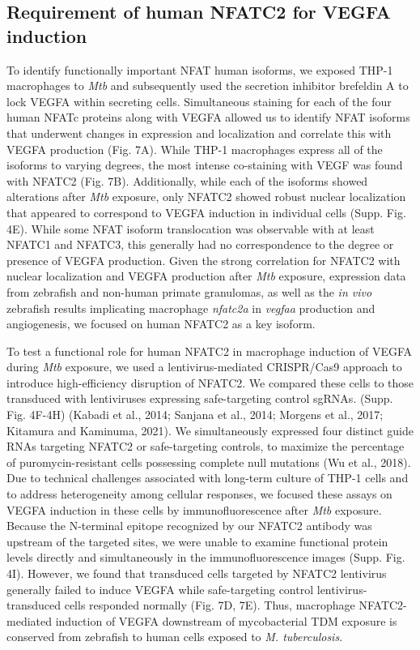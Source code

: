 \subsection{Requirement of human NFATC2 for VEGFA induction}

To identify functionally important NFAT human isoforms, we exposed THP-1 macrophages to \textgamma\textit{Mtb} and subsequently used the secretion inhibitor brefeldin A to lock VEGFA within secreting cells. Simultaneous staining for each of the four human NFATc proteins along with VEGFA allowed us to identify NFAT isoforms that underwent changes in expression and localization and correlate this with VEGFA production (Fig. 7A). While THP-1 macrophages express all of the isoforms to varying degrees, the most intense co-staining with VEGF was found with NFATC2 (Fig. 7B). Additionally, while each of the isoforms showed alterations after \textgamma\textit{Mtb} exposure, only NFATC2 showed robust nuclear localization that appeared to correspond to VEGFA induction in individual cells (Supp. Fig. 4E). While some NFAT isoform translocation was observable with at least NFATC1 and NFATC3, this generally had no correspondence to the degree or presence of VEGFA production. Given the strong correlation for NFATC2 with nuclear localization and VEGFA production after \textgamma\textit{Mtb} exposure, expression data from zebrafish and non-human primate granulomas, as well as the \textit{in vivo} zebrafish results implicating macrophage \textit{nfatc2a} in \textit{vegfaa} production and angiogenesis, we focused on human NFATC2 as a key isoform.

To test a functional role for human NFATC2 in macrophage induction of VEGFA during \textgamma\textit{Mtb} exposure, we used a lentivirus-mediated CRISPR/Cas9 approach to introduce high-efficiency disruption of NFATC2. We compared these cells to those transduced with lentiviruses expressing safe-targeting control sgRNAs. (Supp. Fig. 4F-4H) (Kabadi et al., 2014; Sanjana et al., 2014; Morgens et al., 2017; Kitamura and Kaminuma, 2021). We simultaneously expressed four distinct guide RNAs targeting NFATC2 or safe-targeting controls, to maximize the percentage of puromycin-resistant cells possessing complete null mutations (Wu et al., 2018). Due to technical challenges associated with long-term culture of THP-1 cells and to address heterogeneity among cellular responses, we focused these assays on VEGFA induction in these cells by immunofluorescence after \textgamma\textit{Mtb} exposure. Because the N-terminal epitope recognized by our NFATC2 antibody was upstream of the targeted sites, we were unable to examine functional protein levels directly and simultaneously in the immunofluorescence images (Supp. Fig. 4I). However, we found that transduced cells targeted by NFATC2 lentivirus generally failed to induce VEGFA while safe-targeting control lentivirus-transduced cells responded normally (Fig. 7D, 7E). Thus, macrophage NFATC2-mediated induction of VEGFA downstream of mycobacterial TDM exposure is conserved from zebrafish to human cells exposed to \textit{M. tuberculosis}.


